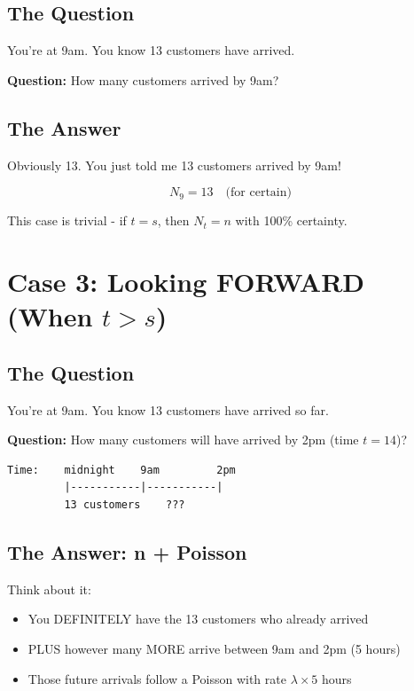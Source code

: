 \documentclass[11pt]{article}
\begin{document}
\subsection{The Question}

You're at 9am. You know 13 customers have arrived.

\textbf{Question:} How many customers arrived by 9am?

\subsection{The Answer}

Obviously 13. You just told me 13 customers arrived by 9am!

\begin{tcolorbox}[colback=blue!10!white,colframe=blue!75!black,title=Answer for Case 2]
\[
N_9 = 13 \quad \text{(for certain)}
\]

This case is trivial - if $t = s$, then $N_t = n$ with 100\% certainty.
\end{tcolorbox}

\section{Case 3: Looking FORWARD (When $t > s$)}

\subsection{The Question}

You're at 9am. You know 13 customers have arrived so far.

\textbf{Question:} How many customers will have arrived by 2pm (time $t = 14$)?

\begin{verbatim}
Time:    midnight    9am         2pm
         |-----------|-----------|
         13 customers    ???
\end{verbatim}

\subsection{The Answer: n + Poisson}

Think about it:
\begin{itemize}
    \item You DEFINITELY have the 13 customers who already arrived
    \item PLUS however many MORE arrive between 9am and 2pm (5 hours)
    \item Those future arrivals follow a Poisson with rate $\lambda \times 5$ hours
\end{itemize}
\end{document}

